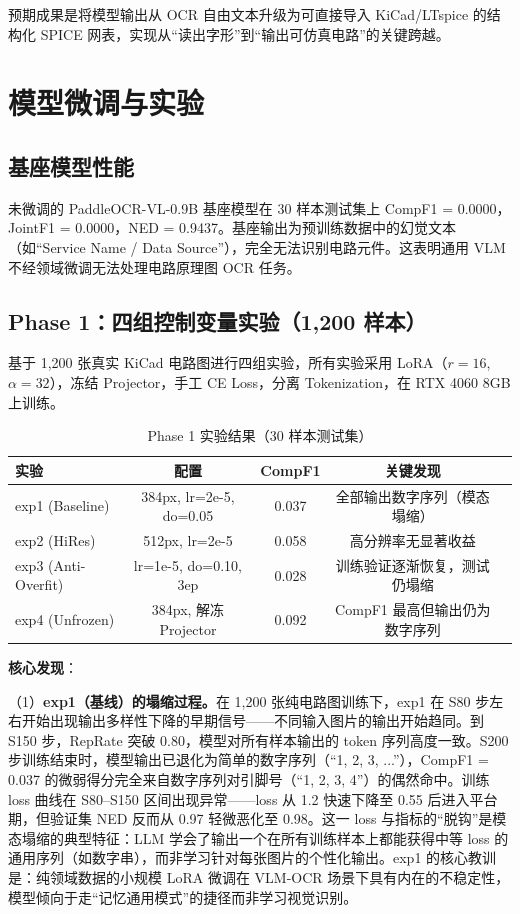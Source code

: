 预期成果是将模型输出从 OCR 自由文本升级为可直接导入 KiCad/LTspice 的结构化 SPICE 网表，实现从``读出字形''到``输出可仿真电路''的关键跨越。

\section{模型微调与实验}

\subsection{基座模型性能}

未微调的 PaddleOCR-VL-0.9B 基座模型在 30 样本测试集上 CompF1 = 0.0000，JointF1 = 0.0000，NED = 0.9437。基座输出为预训练数据中的幻觉文本（如``Service Name / Data Source''），完全无法识别电路元件。这表明通用 VLM 不经领域微调无法处理电路原理图 OCR 任务。

\subsection{Phase 1：四组控制变量实验（1,200 样本）}

基于 1,200 张真实 KiCad 电路图进行四组实验，所有实验采用 LoRA（$r=16$, $\alpha=32$），冻结 Projector，手工 CE Loss，分离 Tokenization，在 RTX 4060 8GB 上训练。

\begin{table}[h]
\centering
\caption{Phase 1 实验结果（30 样本测试集）}
\begin{tabular}{lcccc}
\toprule
\textbf{实验} & \textbf{配置} & \textbf{CompF1} & \textbf{关键发现} \\
\midrule
exp1 (Baseline) & 384px, lr=2e-5, do=0.05 & 0.037 & 全部输出数字序列（模态塌缩） \\
exp2 (HiRes)    & 512px, lr=2e-5           & 0.058 & 高分辨率无显著收益 \\
exp3 (Anti-Overfit) & lr=1e-5, do=0.10, 3ep & 0.028 & 训练验证逐渐恢复，测试仍塌缩 \\
exp4 (Unfrozen)  & 384px, 解冻 Projector     & 0.092 & CompF1 最高但输出仍为数字序列 \\
\bottomrule
\end{tabular}
\end{table}

\textbf{核心发现}：

（1）\textbf{exp1（基线）的塌缩过程。}在 1,200 张纯电路图训练下，exp1 在 S80 步左右开始出现输出多样性下降的早期信号——不同输入图片的输出开始趋同。到 S150 步，RepRate 突破 0.80，模型对所有样本输出的 token 序列高度一致。S200 步训练结束时，模型输出已退化为简单的数字序列（``1, 2, 3, ...''），CompF1 = 0.037 的微弱得分完全来自数字序列对引脚号（``1, 2, 3, 4''）的偶然命中。训练 loss 曲线在 S80--S150 区间出现异常——loss 从 1.2 快速下降至 0.55 后进入平台期，但验证集 NED 反而从 0.97 轻微恶化至 0.98。这一 loss 与指标的``脱钩''是模态塌缩的典型特征：LLM 学会了输出一个在所有训练样本上都能获得中等 loss 的通用序列（如数字串），而非学习针对每张图片的个性化输出。exp1 的核心教训是：纯领域数据的小规模 LoRA 微调在 VLM-OCR 场景下具有内在的不稳定性，模型倾向于走``记忆通用模式''的捷径而非学习视觉识别。

